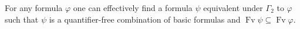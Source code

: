 For any formula $\varphi$ one can effectively find a formula $\psi$ equivalent under $\Gamma_2$ to $\varphi$ such that $\psi$ is a quantifier-free combination of basic formulas and $\operatorname{Fv}\psi \subseteq \operatorname{Fv}\varphi$.
